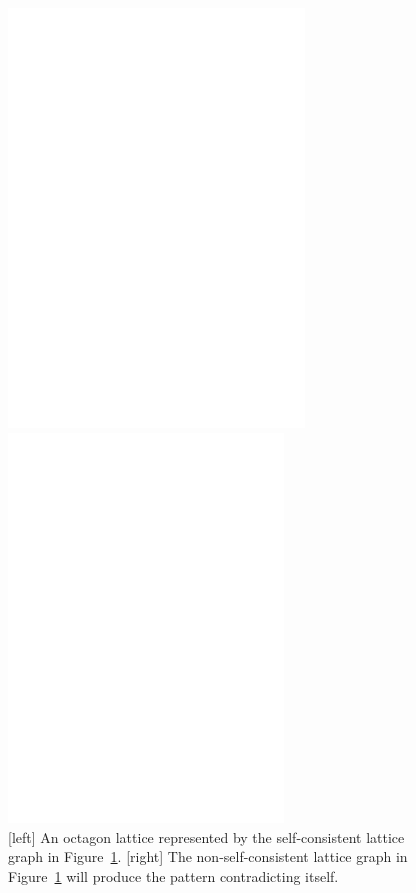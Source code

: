 \begin{figure}
    \centering
    
    \label{fig:lg1}
\end{figure}
\begin{figure}
\centering
    \begin{minipage}[b]{0.45\linewidth}
        \centering
        \includegraphics[width=0.7\textwidth]{figs/badlg-lat}
    \end{minipage}
    \begin{minipage}[b]{0.45\linewidth}
        \centering
        \includegraphics[width=0.65\textwidth]{figs/swirl}
    \end{minipage}
    \caption{[left] An octagon lattice represented by the self-consistent lattice graph in Figure~\ref{fig:lg1}.
    [right] The non-self-consistent lattice graph in Figure~\ref{fig:lg1} will produce the pattern contradicting itself.}
    \label{fig:lg2}
\end{figure}
